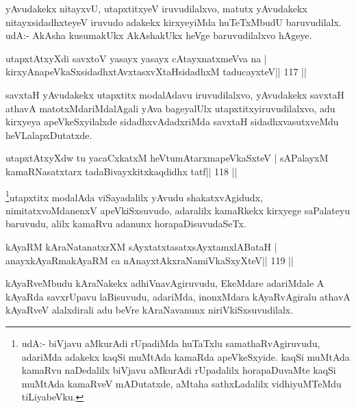 \begin{artha}
yAvudakekx nitayxvU, utapxtitxyeV iruvudilalxvo, matutx yAvudakekx nitayxsidadhxteyeV iruvudo adakekx kirxyeyiMda huTeTxMbudU baruvudilalx. udA:- AkAsha kusumakUkx AkAshakUkx heVge baruvudilalxvo hAgeye.
\end{artha}


\begin{shl}
utapxtAtxyXdi savxtoV yasayx yasayx cAtayxnatxmeVva na |
kirxyAnapeVkaSxsidadhxtAvxtasxvXtaHsidadhxM taducayxteV\hfill || 117 ||
\end{shl}

\begin{artha}
savxtaH yAvudakekx utapxtitx modalAdavu iruvudilalxvo, yAvudakekx savxtaH athavA matotxMdariMdalAgali yAva bageyalUlx utapxtitxyiruvudilalxvo, adu kirxyeya apeVkeSxyilalxde sidadhxvAdadxriMda savxtaH sidadhxvasutxveMdu heVLalapxDutatxde. 
\end{artha}

\begin{shl}
utapxtAtxyXdw tu yacaCxkatxM heVtumAtarxmapeVkaSxteV |
sAPalayxM kamaRNasatxtarx tadaBivayxkitxkaqdidhx tatf\hfill || 118 ||
\end{shl}

\begin{artha}
\footnote{udA:- biVjavu aMkurAdi rUpadiMda huTaTxlu samathaRvAgiruvudu, adariMda adakekx kaqSi muMtAda kamaRda apeVkeSxyide. kaqSi muMtAda kamaRvu naDedalilx biVjavu aMkurAdi rUpadalilx horapaDuvaMte kaqSi muMtAda kamaRveV mADutatxde, aMtaha sathxLadalilx vidhiyuMTeMdu tiLiyabeVku.}utapxtitx modalAda viSayadalilx yAvudu shakatxvAgidudx, nimitatxvoMdanenxV apeVkiSxsuvudo, adaralilx kamaRkekx kirxyege saPalateyu baruvudu, alilx kamaRvu adanunx horapaDisuvudaSeTx.
\end{artha}

\begin{shl}
kAyaRM kAraNatanatxrXM sAyxtatxtasatxsAyx\s\s tamxlABataH |
anayxkAyaRmakAyaRM ca nAnayxtAkxraNamiVkaSxyXteV\hfill || 119 ||
\end{shl}

\begin{artha}
kAyaRveMbudu kAraNakekx adhiVnavAgiruvudu, EkeMdare adariMdale A kAyaRda savxrUpavu laBisuvudu, adariMda, inonxMdara kAyaRvAgiralu athavA kAyaRveV alalxdirali adu beVre kAraNavanunx niriVkiSxsuvudilalx.
\end{artha}

